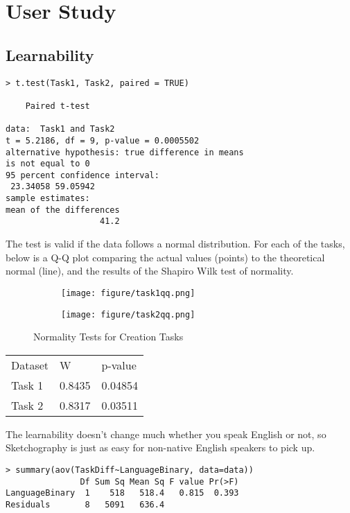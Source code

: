 \section{User Study}
\subsection{Learnability}
\begin{verbatim}
> t.test(Task1, Task2, paired = TRUE)

	Paired t-test

data:  Task1 and Task2
t = 5.2186, df = 9, p-value = 0.0005502
alternative hypothesis: true difference in means 
is not equal to 0
95 percent confidence interval:
 23.34058 59.05942
sample estimates:
mean of the differences 
                   41.2 
\end{verbatim}

The test is valid if the data follows a normal distribution. For each of the tasks, below is a Q-Q plot comparing the actual values (points) to the theoretical normal (line), and the results of the Shapiro Wilk test of normality.

\begin{figure}[H]
		\centering
		\begin{subfigure}[b]{\textwidth}
			\texttt{[image: figure/task1qq.png]}
		\end{subfigure}
		\begin{subfigure}[b]{\textwidth}
			\texttt{[image: figure/task2qq.png]}
		\end{subfigure}
		\caption{Normality Tests for Creation Tasks}
	\end{figure}

\begin{tabular}{l l l}
Dataset & W & p-value \\
Task 1 & 0.8435 & 0.04854 \\
Task 2 & 0.8317 & 0.03511 \\
\end{tabular}

The learnability doesn't change much whether you speak English or not, so Sketchography is just as easy for non-native English speakers to pick up.
\begin{verbatim}
> summary(aov(TaskDiff~LanguageBinary, data=data))
               Df Sum Sq Mean Sq F value Pr(>F)
LanguageBinary  1    518   518.4   0.815  0.393
Residuals       8   5091   636.4                       
\end{verbatim}

